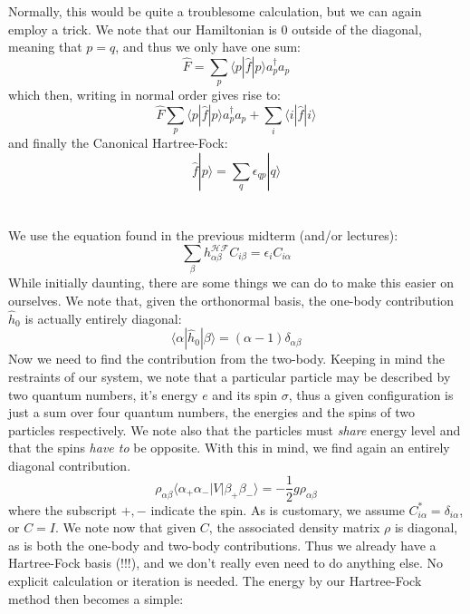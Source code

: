 \documentclass{article}
\begin{document}
Normally, this would be quite a troublesome calculation, but we can again employ a trick. We note that our Hamiltonian is 0 outside of the diagonal, meaning that $p=q$, and thus we only have one sum:
\begin{equation*}
    \hat F = \sum_p \langle p | \hat f | p \rangle a_p^\dagger a_p
\end{equation*}
which then, writing in normal order gives rise to:
\begin{equation*}
    \hat F \sum_p \langle p | \hat f | p \rangle a_p^\dagger a_p + \sum_i \langle i | \hat f | i \rangle
\end{equation*}
and finally the Canonical Hartree-Fock:
\begin{equation}
    \hat f | p \rangle = \sum_q \epsilon_{qp} | q\rangle
\end{equation}
\section{}
We use the equation found in the previous midterm (and/or lectures):
\begin{equation*}
        \sum_\beta h_{\alpha\beta}^{\mathcal{H}\mathcal{F}} C_{i\beta} = \epsilon_i C_{i \alpha}
\end{equation*}
While initially daunting, there are some things we can do to make this easier on ourselves. We note that, given the orthonormal basis, the one-body contribution $\hat h_0$ is actually entirely diagonal:
\begin{equation*}
    \langle \alpha | \hat h_0 | \beta \rangle = (\alpha - 1)\delta_{\alpha \beta}
\end{equation*}
Now we need to find the contribution from the two-body. Keeping in mind the restraints of our system, we note that a particular particle may be described by two quantum numbers, it's energy $e$ and its spin $\sigma$, thus a given configuration is just a sum over four quantum numbers, the energies and the spins of two particles respectively. We note also that the particles must \emph{share} energy level and that the spins \emph{have to} be opposite. With this in mind, we find again an entirely diagonal contribution.
\begin{equation*}
    \rho_{\alpha\beta}  \langle \alpha_+ \alpha_- |  V | \beta_+ \beta_- \rangle = -\frac{1}{2} g\rho_{\alpha\beta}
\end{equation*}
where the subscript $+, -$ indicate the spin.
\newline
As is customary, we assume $C_{i\alpha}^* = \delta_{i \alpha}$, or $C = I$. We note now that given $C$, the associated density matrix $\rho$ is diagonal, as is both the one-body and two-body contributions. Thus we already have a Hartree-Fock basis (!!!), and we don't really even need to do anything else. No explicit calculation or iteration is needed. The energy by our Hartree-Fock method then becomes a simple:
\end{document}
